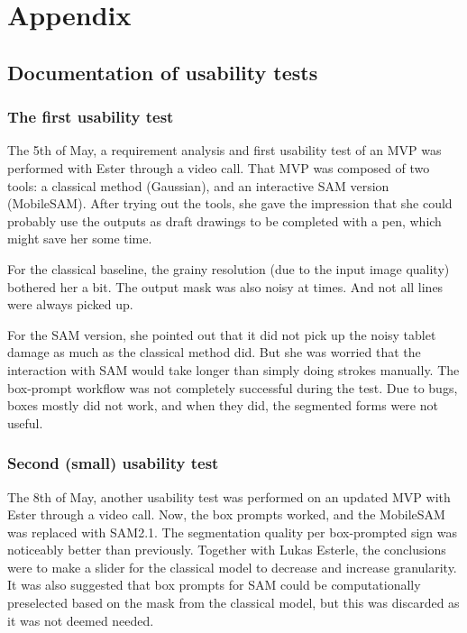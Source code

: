 \chapter{Appendix}



\section{Documentation of usability tests}
\label{appendix:usability-tests}

\subsection{The first usability test}
The 5th of May, a requirement analysis and first usability test of an MVP was performed with Ester through a video call.
That \acs{MVP} was composed of two tools: a classical method (\acs{Gaussian}), and an interactive \acs{SAM} version (Mobile\acs{SAM}).
After trying out the tools, she gave the impression that she could probably use the outputs as draft drawings to be completed with a pen, which might save her some time.

For the classical baseline, the grainy resolution (due to the input image quality) bothered her a bit.
The output mask was also noisy at times. And not all lines were always picked up.

For the \acs{SAM} version, she pointed out that it did not pick up the noisy tablet damage as much as the classical method did.
But she was worried that the interaction with \acs{SAM} would take longer than simply doing strokes manually.
The box-prompt workflow was not completely successful during the test.
Due to bugs, boxes mostly did not work, and when they did, the segmented forms were not useful.

\subsection{Second (small) usability test}

The 8th of May, another usability test was performed on an updated MVP with Ester through a video call.
Now, the box prompts worked, and the Mobile\acs{SAM} was replaced with \acs{SAM}2.1.
The segmentation quality per box-prompted sign was noticeably better than previously.
Together with Lukas Esterle, the conclusions were to make a slider for the classical model to decrease and increase granularity.
It was also suggested that box prompts for \acs{SAM} could be computationally preselected based on the mask from the classical model, but this was discarded as it was not deemed needed.

